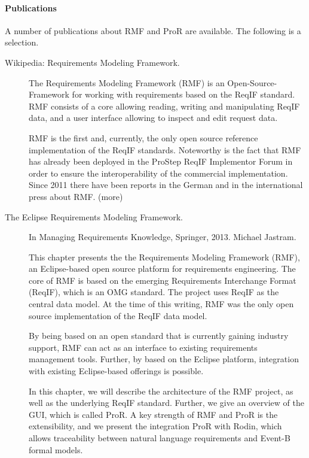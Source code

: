 \paragraph{Publications}

A number of publications about RMF and ProR are available.  The following is a selection.

\begin{description}

\item[Wikipedia: Requirements Modeling Framework.]  The Requirements Modeling Framework (RMF) is an Open-Source-Framework for working with requirements based on the ReqIF standard. RMF consists of a core allowing reading, writing and manipulating ReqIF data, and a user interface allowing to inspect and edit request data.

RMF is the first and, currently, the only open source reference implementation of the ReqIF standards. Noteworthy is the fact that RMF has already been deployed in the ProStep ReqIF Implementor Forum in order to ensure the interoperability of the commercial implementation. Since 2011 there have been reports in the German and in the international press about RMF. (more)

\item[The Eclipse Requirements Modeling Framework.] In Managing Requirements Knowledge, Springer, 2013. Michael Jastram.

 This chapter presents the the Requirements Modeling Framework (RMF), an Eclipse-based open source platform for requirements engineering. The core of RMF is based on the emerging Requirements Interchange Format (ReqIF), which is an OMG standard. The project uses ReqIF as the central data model. At the time of this writing, RMF was the only open source implementation of the ReqIF data model.

By being based on an open standard that is currently gaining industry support, RMF can act as an interface to existing requirements management tools. Further, by based on the Eclipse platform, integration with existing Eclipse-based offerings is possible.

In this chapter, we will describe the architecture of the RMF project, as well as the underlying ReqIF standard. Further, we give an overview of the GUI, which is called ProR. A key strength of RMF and ProR is the extensibility, and we present the integration ProR with Rodin, which allows traceability between natural language requirements and Event-B formal models. 


\end{description}
